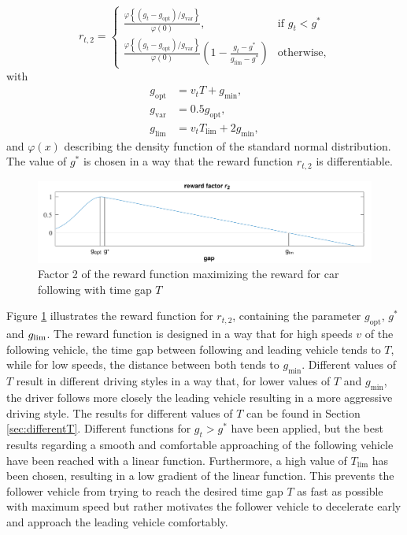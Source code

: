 \documentclass[review]{elsarticle}
\providecommand{\martinc}[1]{}                  %
\providecommand{\sub}[1]{_{\mathrm{#1}}}  %
\providecommand{\3}{{\ss}}
\begin{document}
	
	\begin{equation}
	\label{eq:r2_CFP}
	r_{t,2}  = 
	\begin{cases}
	\frac{\varphi\left\{(g_t-g\sub{opt})/g\sub{var}\right\}}{\varphi(0)}, & \text{if } g_t < g^*\\
	\frac{\varphi\left\{(g_t-g\sub{opt})/g\sub{var}\right\}}{\varphi(0)}\left(1-\frac{g_t-g^*}{g\sub{lim} - g^*}\right)  & \text{otherwise},
	\end{cases}
	\end{equation}
	with 
	\begin{align}
	g\sub{opt} &= v_tT + g\sub{min},\\
	g\sub{var} &= 0.5g\sub{opt},\\
	g\sub{lim} &= v_tT\sub{lim} + 2g\sub{min},
	\end{align}
	and $\varphi(x)$ describing the density function of the standard normal distribution. The value of $g^*$ is chosen in a way that the reward function $r_{t,2}$ is differentiable.
	\begin{figure}
		\centering
		\includegraphics[width=12cm]{images/RewardFunc1}
		\caption{Factor 2 of the reward function maximizing the reward
			for car following with time gap $T$} 
		\label{fig:RewardFunc1}
	\end{figure}
	Figure \ref{fig:RewardFunc1} illustrates the reward function for
	$r_{t,2}$, containing the parameter $g\sub{opt}$, $g^*$ and $g_{\rm
		lim}$. The reward function is designed in a way that for high speeds $v$
	of the following vehicle, the time gap between following and leading
	vehicle tends to $T$, while for low speeds, the distance
	between both tends to $g\sub{min}$. Different values of $T$
	result in different driving styles in a way that, for lower values of
	$T$ and $g\sub{min}$, the driver follows
	more closely the leading vehicle resulting in a more aggressive
	driving style. The results for different values of $T$ can
	be found in Section \ref{sec:differentT}. Different functions for $g_t
	> g^*$ have been applied, but the best results regarding a smooth and
	comfortable approaching of the following vehicle have been reached with
	a linear function. Furthermore, a high value of $T\sub{lim}$ has been
	chosen, resulting in a low gradient of the linear function. This
	prevents the follower vehicle from trying to reach the desired time gap $T$
	as fast as possible with maximum speed \martinc{maximal
		speed: sehr hohe Geschwindigkeit; maximum speed: maximale
		Geschwindigkeit, also $v\sub{des}$. Ich glaube, Letzteres ist hier gemeint.}but rather motivates the follower vehicle to decelerate early and approach the leading vehicle comfortably.
	
\end{document}
